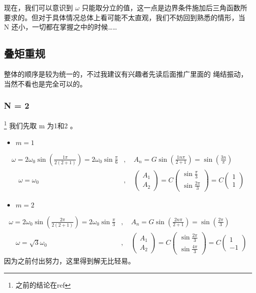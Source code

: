 \documentclass[11pt]{book}
\begin{document}
现在，我们可以意识到 \(\omega\) 只能取分立的值，这一点是边界条件施加后三角函数所要求的。但对于具体情况总体上看可能不太直观，我们不妨回到熟悉的情形，当 N 还小，一切都在掌握之中的时候……

\subsection{叠矩重规}
\label{sec:orgce0cb67}
整体的顺序是较为统一的，不过我建议有兴趣者先读后面推广里面的
绳结振动，当然不看也是完全可以的。

\subsubsection{N = 2}
\label{sec:org68e69ee}
\footnote{之前的结论在ref}
我们先取 m 为1和2 。
\begin{itemize}
\item \(m=1\)
\end{itemize}
\begin{equation}
\label{eq:34}
\begin{split}
\omega = 2\omega_0\sin(\frac{1\pi}{2(2+1)})=2\omega_0\sin \frac{\pi}{6}&,\quad A_n=G\sin(\frac{1n\pi}{2+1})=\sin(\frac{3n}{\pi})\\
\quad\omega=\omega_0&,\quad
\begin{pmatrix}
A_1\\A_2
\end{pmatrix}
=C
\begin{pmatrix}
\sin \frac{\pi}{3}\\\sin \frac{2\pi}{3}
\end{pmatrix}=C
\begin{pmatrix}
1\\1
\end{pmatrix}
\end{split}
\end{equation}
\begin{itemize}
\item \(m=2\)
\end{itemize}
\begin{equation}
\begin{split}
\omega = 2\omega_0\sin(\frac{2\pi}{2(2+1)})=2\omega_0\sin \frac{\pi}{3}&,\quad A_n=G\sin(\frac{2n\pi}{2+1})=\sin(\frac{2\pi}{3})\\
\quad\omega=\sqrt{3}\omega_0&,\quad
\begin{pmatrix}
A_1\\A_2
\end{pmatrix}
=C
\begin{pmatrix}
\sin \frac{2\pi}{3}\\\sin \frac{4\pi}{3}
\end{pmatrix}=C
\begin{pmatrix}
1\\-1
\end{pmatrix}
\end{split}
\end{equation}
因为之前付出努力，这里得到解无比轻易。
\end{document}
